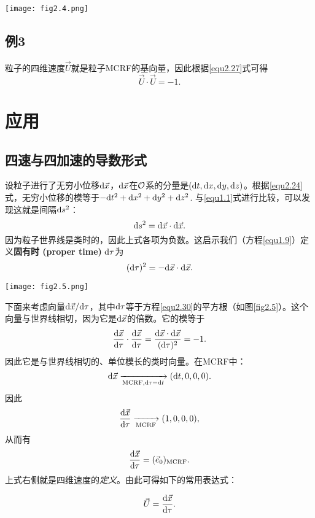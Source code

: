 {
    \centering
    \texttt{[image: fig2.4.png]}
    \label{fig2.4}
}

\subsection*{例3}
粒子的四维速度$\vec{U}$就是粒子MCRF的基向量，因此根据\eqref{equ2.27}式可得
\begin{equation}
    \vec{U} \cdot \vec{U} = -1.
\label{equ2.28}
\end{equation}

\section{应用}
\label{sec2.6}

\subsection*{四速与四加速的导数形式}
设粒子进行了无穷小位移$\mathrm{d} \vec{x}$，$\mathrm{d} \vec{x}$在$\mathcal{O}$系的分量是$(\mathrm{d} t, \mathrm{d} x, \mathrm{d} y, \mathrm{d} z)$。根据\eqref{equ2.24}式，无穷小位移的模等于$-\mathrm{d} t^2 + \mathrm{d} x^2 + \mathrm{d} y^2 + \mathrm{d} z^2$. 与\eqref{equ1.1}式进行比较，可以发现这就是间隔$\mathrm{d} s^2$：
\begin{equation}
    \mathrm{d} s^2 = \mathrm{d} \vec{x} \cdot \mathrm{d} \vec{x}.
\label{equ2.29}
\end{equation}
因为粒子世界线是类时的，因此上式各项为负数。这启示我们（方程\eqref{equ1.9}）定义\textbf{固有时 (proper time)} $\mathrm{d} \tau$为
\begin{equation}
    (\mathrm{d} \tau)^2 = -\mathrm{d} \vec{x} \cdot \mathrm{d} \vec{x}.
\label{equ2.30}
\end{equation}

{
    \centering
    \texttt{[image: fig2.5.png]}
    \label{fig2.5}
}

下面来考虑向量$\mathrm{d} \vec{x} / \mathrm{d} \tau$，其中$\mathrm{d} \tau$等于方程\eqref{equ2.30}的平方根（如图\ref{fig2.5}）。这个向量与世界线相切，因为它是$\mathrm{d} \vec{x}$的倍数。它的模等于
\begin{equation*}
    \frac{\mathrm{d} \vec{x}}{\mathrm{d} \tau} \cdot \frac{\mathrm{d} \vec{x}}{\mathrm{d} \tau} = \frac{\mathrm{d} \vec{x} \cdot \mathrm{d} \vec{x}}{(\mathrm{d} \tau)^2} = -1.
\end{equation*}
因此它是与世界线相切的、单位模长的类时向量。在MCRF中：
\[
    \mathrm{d} \vec{x} \xrightarrow[\text{MCRF}, \mathrm{d} \tau = \mathrm{d} t]{ } (\mathrm{d} t, 0, 0, 0).
\]
因此
\[
    \frac{\mathrm{d} \vec{x}}{\mathrm{d} \tau} \xrightarrow[\text{MCRF}]{ } (1, 0, 0, 0),
\]
从而有
\[
    \frac{\mathrm{d} \vec{x}}{\mathrm{d} \tau} = (\vec{e}_0)_{\text{MCRF}}.
\]
上式右侧就是四维速度的\textit{定义}。由此可得如下的常用表达式：
\begin{shaded}
\begin{equation}
    \vec{U} = \frac{\mathrm{d} \vec{x}}{\mathrm{d} \tau}.
\label{equ2.31}
\end{equation}
\end{shaded}

